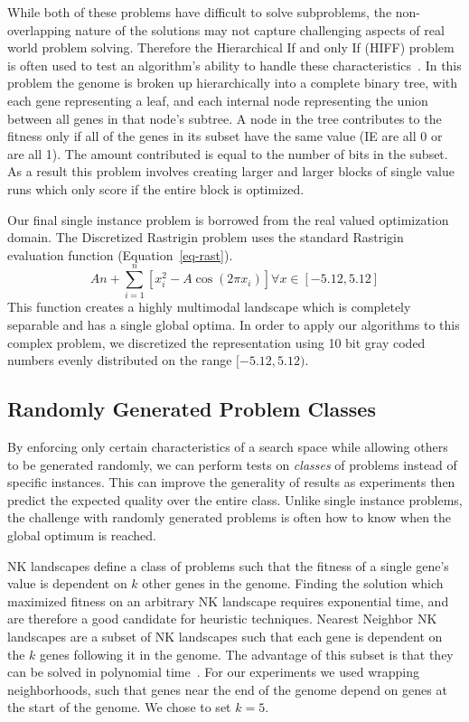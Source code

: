 \documentclass{sig-alternate}
\begin{document}
While both of these problems have difficult to solve subproblems, the non-overlapping
nature of the solutions may not capture challenging aspects of real world problem solving.
Therefore the Hierarchical If and only If (HIFF) problem is often used to test an
algorithm's ability to handle these characteristics~\cite{thierens:2013:ltgahiff}.
In this problem the genome is broken up hierarchically into a complete binary tree,
with each gene representing a leaf, and each internal node representing the union
between all genes in that node's subtree.  A node in the tree contributes to the fitness
only if all of the genes in its subset have the same value (IE are all 0 or are all 1).
The amount contributed is equal to the number of bits in the subset.  As a result
this problem involves creating larger and larger blocks of single value runs which
only score if the entire block is optimized.

Our final single instance problem is borrowed from the real valued optimization domain.
The Discretized Rastrigin problem uses the standard Rastrigin evaluation function (Equation~\ref{eq-rast}).
\begin{equation}
  An + \sum_{i=1}^{n}\left [ x_i^2-A\cos (2\pi x_i) \right ] \forall x\in [-5.12,5.12]
  \label{eq-rast}
\end{equation}
This function creates a highly multimodal landscape which is completely separable
and has a single global optima.  In order to apply our algorithms to this complex problem,
we discretized the representation using 10 bit gray coded numbers evenly distributed
on the range $[-5.12,5.12)$.

\subsection{Randomly Generated Problem Classes}
By enforcing only certain characteristics of a search space while allowing others
to be generated randomly, we can perform tests on \emph{classes} of problems instead
of specific instances.  This can improve the generality of results as experiments
then predict the expected quality over the entire class.  Unlike single
instance problems, the challenge with randomly generated problems is often how
to know when the global optimum is reached.

NK landscapes define a class of problems such that the fitness of a single gene's
value is dependent on $k$ other genes in the genome.  Finding the solution which
maximized fitness on an arbitrary NK landscape requires exponential time, and
are therefore a good candidate for heuristic techniques.  Nearest Neighbor NK
landscapes are a subset of NK landscapes such that each gene is dependent on the $k$
genes following it in the genome.  The advantage of this subset is that they can be
solved in polynomial time~\cite{wright:2000:solvingnk}.  For our experiments we
used wrapping neighborhoods, such that genes near the end of the genome depend on
genes at the start of the genome.  We chose to set $k=5$.
\end{document}
